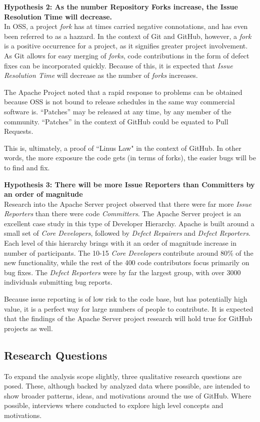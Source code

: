 \documentclass{proc}
\begin{document}
\noindent \textbf{Hypothesis 2: As the number Repository Forks increase, the Issue Resolution Time will decrease.}\\
In OSS, a project \emph{fork} has at times carried negative connotations, and has even been referred to as a hazzard\cite{kogut2001open}. In the context of Git and GitHub, however, a \emph{fork} is a positive occurrence for a project, as it signifies greater project involvement. As Git allows for easy merging of \emph{forks}, code contributions in the form of defect fixes can be incorporated quickly. Because of this, it is expected that \emph{Issue Resolution Time} will decrease as the number of \emph{forks} increases.

The Apache Project noted that a rapid response to problems can be obtained because OSS is not bound to release schedules in the same way commercial software is. ``Patches'' may be released at any time, by any member of the community\cite{mockus2000case}. ``Patches'' in the context of GitHub could be equated to Pull Requests.

This is, ultimately, a proof of ``Linus Law"\cite{raymond1999cathedral} in the context of GitHub. In other words, the more exposure the code gets (in terms of forks), the easier bugs will be to find and fix.

\noindent \textbf{Hypothesis 3: There will be more Issue Reporters than Committers by an order of magnitude}\\
Research into the Apache Server project observed that there were far more \emph{Issue Reporters} than there were code \emph{Committers}\cite{mockus2000case}. The Apache Server project is an excellent case study in this type of Developer Hierarchy. Apache is built around a small set of {\it Core Developers}, followed by {\it Defect Repairers} and {\it Defect Reporters}. Each level of this hierarchy brings with it an order of magnitude increase in number of participants. The 10-15 {\it Core Developers} contribute around 80\% of the new functionality, while the rest of the 400 code contributors focus primarily on bug fixes. The {\it Defect Reporters} were by far the largest group, with over 3000 individuals submitting bug reports.

Because issue reporting is of low risk to the code base, but has potentially high value, it is a perfect way for large numbers of people to contribute. It is expected that the findings of the Apache Server project research will hold true for GitHub projects as well.

\subsection{Research Questions}
To expand the analysis scope slightly, three qualitative research questions are posed. These, although backed by analyzed data where possible, are intended to show broader patterns, ideas, and motivations around the use of GitHub. Where possible, interviews\cite{begel2013social} where conducted to explore high level concepts and motivations.
\end{document}
